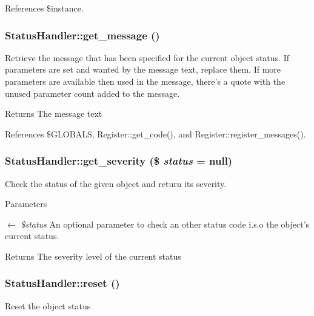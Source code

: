 References \$instance.

\subsubsection[{get\_\-message}]{\setlength{\rightskip}{0pt plus 5cm}StatusHandler::get\_\-message ()}\label{classStatusHandler_a79170bca79bfd82e3f707e1294e7c916}
Retrieve the message that has been specified for the current object status. If parameters are set and wanted by the message text, replace them. If more parameters are available then used in the message, there's a quote with the unused parameter count added to the message.

\begin{DoxyReturn}{Returns}
The message text 
\end{DoxyReturn}


References \$GLOBALS, Register::get\_\-code(), and Register::register\_\-messages().

\subsubsection[{get\_\-severity}]{\setlength{\rightskip}{0pt plus 5cm}StatusHandler::get\_\-severity (\$ {\em status} = {\ttfamily null})}\label{classStatusHandler_acadd0806c17eb02abcc92882e8588d4e}
Check the status of the given object and return its severity.


\begin{DoxyParams}{Parameters}
\item[\mbox{$\leftarrow$} {\em \$status}]An optional parameter to check an other status code i.s.o the object's current status. \end{DoxyParams}
\begin{DoxyReturn}{Returns}
The severity level of the current status 
\end{DoxyReturn}
\subsubsection[{reset}]{\setlength{\rightskip}{0pt plus 5cm}StatusHandler::reset ()}\label{classStatusHandler_a8b0a327d3272ae49032a596518d47164}
Reset the object status 
